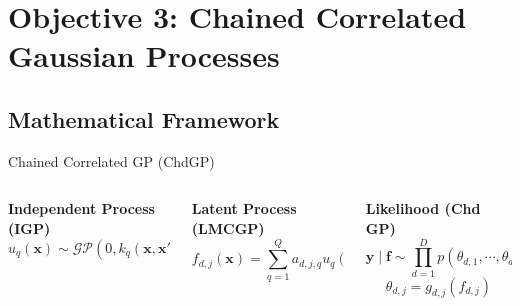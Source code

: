 \section{Objective 3: Chained Correlated Gaussian Processes}

\subsection{Mathematical Framework}

\begin{frame}{Chained Correlated GP (ChdGP)}
	\scriptsize
	\centering
	\setlength{} 
	\setlength{}
		
	\vspace{-0.6em}
	\begin{columns}[T] %
		\begin{column}{0.33\textwidth}
			\centering	
			\textcolor{mygreen}{
			\textbf{Independent Process (IGP)}
			\vspace{-1.3em}
			\begin{equation*}
				u_{q}(\mathbf{x}) \sim \mathcal{GP}(0, k_{q}(\mathbf{x}, \mathbf{x}'))
			\end{equation*}
			}
		\end{column}
		
		\begin{column}{0.33\textwidth}
			\centering
			\textcolor{myblue}{
				\textbf{Latent Process (LMCGP)}
				\vspace{-1.3em}
			\begin{equation*}
				f_{d,j}(\mathbf{x}) = \sum_{q=1}^Q a_{d,j,q} u_{q}(\mathbf{x})
			\end{equation*}
			}
		\end{column}
		
		\begin{column}{0.33\textwidth}
			\centering
			\textcolor{myred}{
				\textbf{Likelihood (Chd GP)}
				\vspace{-1.3em}
			\begin{equation*}
				\mathbf{y} \mid \mathbf{f} \sim \prod_{d=1}^D p(\theta_{d, 1}, \cdots, \theta_{d, J_d})
			\end{equation*}
			\vspace{-1.5em}
			\begin{equation*}
				\theta_{d, j} = g_{d, j}(f_{d, j})
			\end{equation*}
			}
		\end{column}
		
	\end{columns}
\end{frame}



